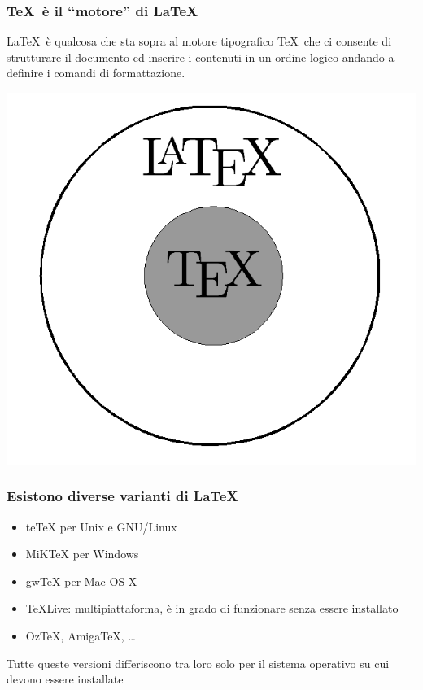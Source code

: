 \documentclass[10pt,svgnames,%
ucs,%
pdftex]{mybeamer}
\begin{document}
\begin{frame}
	\frametitle{\TeX\ \`e il ``motore'' di \LaTeX}
	\begin{block}{}
		\LaTeX\ è qualcosa che sta sopra al motore tipografico \TeX\ che ci consente di strutturare il documento ed inserire i contenuti in un ordine logico andando a definire i comandi di formattazione.
	\end{block}
	\begin{center}
		\includegraphics[scale=.3]{img/texlatex}%
	\end{center}
\end{frame}

\begin{frame}
	\frametitle{Esistono diverse varianti di \LaTeX}
	\begin{itemize}
		\item\alert{te\TeX} per Unix e GNU/Linux
		\item\alert{MiK\TeX} per Windows
		\item\alert{gw\TeX} per Mac OS X
		\item\alert{\TeX Live}: multipiattaforma, \`e in grado di
		funzionare senza essere installato
		\item\alert{Oz\TeX}, \alert{Amiga\TeX}, \dots
	\end{itemize}
	\bigskip
	Tutte queste versioni differiscono tra loro solo per il sistema
	operativo su cui devono essere installate
\end{frame}
\end{document}
